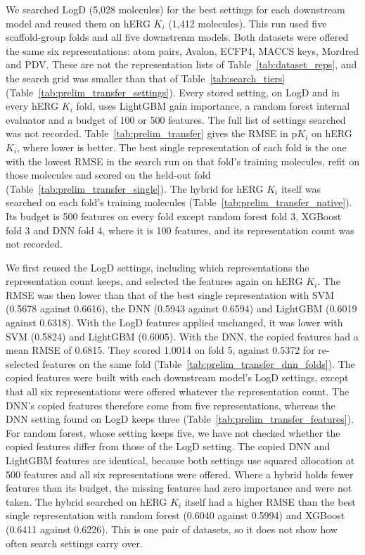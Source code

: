 
We searched LogD (5,028 molecules) for the best settings for each downstream model and reused them on hERG $K_i$ (1,412 molecules). This run used five scaffold-group folds and all five downstream models. Both datasets were offered the same six representations: atom pairs, Avalon, ECFP4, MACCS keys, Mordred and PDV. These are not the representation lists of Table~\ref{tab:dataset_reps}, and the search grid was smaller than that of Table~\ref{tab:search_tiers} (Table~\ref{tab:prelim_transfer_settings}). Every stored setting, on LogD and in every hERG $K_i$ fold, uses LightGBM gain importance, a random forest internal evaluator and a budget of 100 or 500 features. The full list of settings searched was not recorded. Table~\ref{tab:prelim_transfer} gives the RMSE in p$K_i$ on hERG $K_i$, where lower is better. The best single representation of each fold is the one with the lowest RMSE in the search run on that fold's training molecules, refit on those molecules and scored on the held-out fold (Table~\ref{tab:prelim_transfer_single}). The hybrid for hERG $K_i$ itself was searched on each fold's training molecules (Table~\ref{tab:prelim_transfer_native}). Its budget is 500 features on every fold except random forest fold 3, XGBoost fold 3 and DNN fold 4, where it is 100 features, and its representation count was not recorded.

We first reused the LogD settings, including which representations the representation count keeps, and selected the features again on hERG $K_i$. The RMSE was then lower than that of the best single representation with SVM (0.5678 against 0.6616), the DNN (0.5943 against 0.6594) and LightGBM (0.6019 against 0.6318). With the LogD features applied unchanged, it was lower with SVM (0.5824) and LightGBM (0.6005). With the DNN, the copied features had a mean RMSE of 0.6815. They scored 1.0014 on fold 5, against 0.5372 for re-selected features on the same fold (Table~\ref{tab:prelim_transfer_dnn_folds}). The copied features were built with each downstream model's LogD settings, except that all six representations were offered whatever the representation count. The DNN's copied features therefore come from five representations, whereas the DNN setting found on LogD keeps three (Table~\ref{tab:prelim_transfer_features}). For random forest, whose setting keeps five, we have not checked whether the copied features differ from those of the LogD setting. The copied DNN and LightGBM features are identical, because both settings use squared allocation at 500 features and all six representations were offered. Where a hybrid holds fewer features than its budget, the missing features had zero importance and were not taken. The hybrid searched on hERG $K_i$ itself had a higher RMSE than the best single representation with random forest (0.6040 against 0.5994) and XGBoost (0.6411 against 0.6226). This is one pair of datasets, so it does not show how often search settings carry over.

